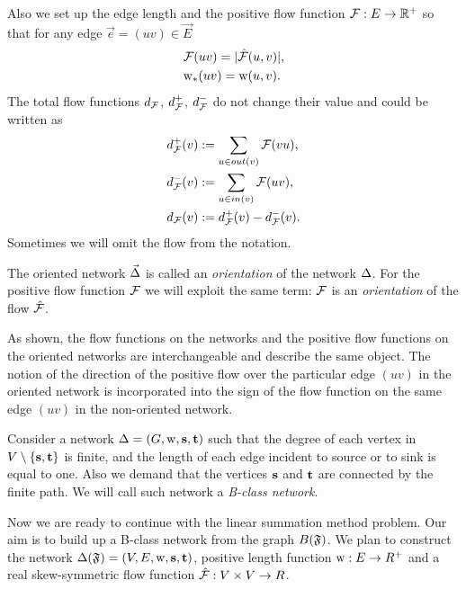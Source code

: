 \documentclass[12pt]{article}
\begin{document}
    Also we set up the edge length and the positive flow function $\mathcal{F}: E \to \mathbb{R}^{+}$ so that
    for any edge $\vec{e} = (uv) \in \vec{E}$
    \begin{align*}
      &\mathcal{F}(uv) = |\mathcal{\hat{F}}(u,v)|,\\
      &\mathrm{w}_{*}(uv) = \mathrm{w}(u,v).
    \end{align*}
    The total flow functions $d_{\mathcal{F}}$, $d^{+}_{\mathcal{F}}$, $d^{-}_{\mathcal{F}}$ do not change their value and could be written as
    \begin{align*}
      &d^{+}_{\mathcal{F}}(v) := \sum_{u \in out(v)} \mathcal{F}(vu),\\
      &d^{-}_{\mathcal{F}}(v) := \sum_{u \in in(v)} \mathcal{F}(uv),\\
      &d_{\mathcal{F}}(v) := d^{+}_{\mathcal{F}}(v) - d^{-}_{\mathcal{F}}(v).
    \end{align*}
    Sometimes we will omit the flow from the notation.
    \begin{definition}
      The oriented network $\vec{\Delta}$ is called an \emph{orientation} of the network $\Delta$.
      For the positive flow function $\mathcal{F}$ we will exploit the same term:
        $\mathcal{F}$ is an \emph{orientation} of the flow $\mathcal{\hat{F}}$.
    \end{definition}
    \begin{remark}
      As shown, the flow functions on the networks and the positive flow functions on the oriented networks
        are interchangeable and describe the same object.
      The notion of the direction of the positive flow over the particular edge $(uv)$ in the oriented network
        is incorporated into the sign of the flow function on the same edge $(uv)$ in the non-oriented network.
    \end{remark}
    \begin{definition}
      Consider a network $\Delta = (G, \mathrm{w}, \mathbf{s}, \mathbf{t})$ such that
        the degree of each vertex in $V \setminus \{\mathbf{s}, \mathbf{t}\} $ is finite,
        and the length of each edge incident to source or to sink is equal to one.
      Also we demand that the vertices $\mathbf{s}$ and $\mathbf{t}$ are connected by the finite path.
      We will call such network a \emph{B-class network}.
    \end{definition}
    Now we are ready to continue with the linear summation method problem.
    Our aim is to build up a B-class network from the graph $B(\mathfrak{F})$.
    We plan to construct the network $\Delta(\mathfrak{F}) = (V, E, \mathrm{w}, \mathbf{s}, \mathbf{t})$,
    positive length function $\mathrm{w}: E \to R^{+}$ and a real skew-symmetric flow function $\mathcal{\hat{F}}: V \times V \to R$.
\end{document}
